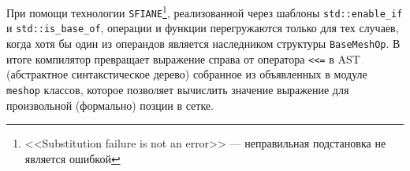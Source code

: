 При помощи технологии \verb'SFIANE'\footnote{<<Substitution failure is not an error>> --- неправильная подстановка не является ошибкой},
реализованной через шаблоны \verb'std::enable_if' и \verb'std::is_base_of', операции и функции перегружаются только для тех случаев,
когда хотя бы один из операндов является наследником структуры \verb'BaseMeshOp'. В итоге компилятор превращает
выражение справа от оператора \verb'<<=' в AST (абстрактное синтакстическое дерево) собранное из
объявленных в модуле \verb'meshop' классов, которое позволяет  вычислить значение выражение для произвольной (формально) позции в сетке. 

